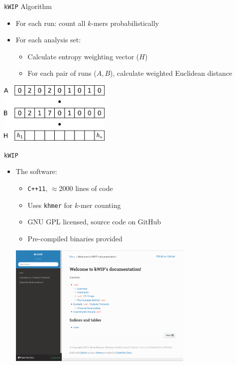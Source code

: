 \documentclass[t]{beamer}
\begin{document}
\begin{frame}{\texttt{kWIP} Algorithm}
  \begin{itemize}
    \item For each run: count all $k$-mers probabilistically
    \item For each analysis set:
      \begin{itemize}
        \item Calculate entropy weighting vector ($H$)
        \item For each pair of runs ($A, B$), calculate weighted Euclidean
              distance
      \end{itemize}
  \end{itemize}
  \begin{center}
    \includegraphics[width=0.4\textwidth]{img/hash-wip.png}
  \end{center}
\end{frame}

\begin{frame}{\texttt{kWIP}}
  \begin{itemize}
    \item The software:
      \begin{itemize}
        \item \texttt{C++11}, $\approx$2000 lines of code
        \item Uses \texttt{khmer} for $k$-mer counting
        \item GNU GPL licensed, source code on GitHub
        \item Pre-compiled binaries provided
      \end{itemize}
      \begin{center}
        \includegraphics[width=0.7\textwidth]{img/kwip-doc-screenshot.png}
      \end{center}
  \end{itemize}
\end{frame}
\end{document}
